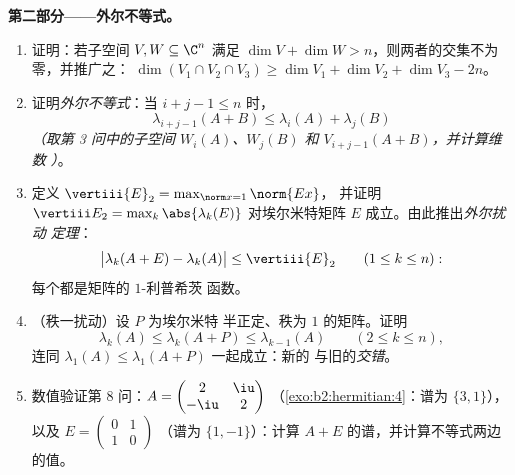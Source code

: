 \begin{problem}
\medskip
\noindent\textbf{第二部分——外尔不等式。}
\begin{enumerate}[resume]
  \item 证明：若子空间 $V, W \subseteq \C^n$ 满足 $\dim V
        + \dim W > n$，则两者的交集不为零，并推广之：
        $\dim(V_1 \cap V_2 \cap V_3) \geq \dim V_1 + \dim V_2 +
        \dim V_3 - 2n$。
  \item 证明\emph{外尔不等式}：当 $i + j - 1 \leq n$ 时，
        \[
        \lambda_{i+j-1}(A + B) \leq \lambda_i(A) +
        \lambda_j(B)
        \]
        \emph{（取第 3 问中的子空间 $W_i(A)$、$W_j(B)$ 和
        $V_{i+j-1}(A+B)$，并计算维数
        ）}。
  \item 定义 $\vertiii{E}_2 = \max_{\norm x = 1}\norm{Ex}$，
        并证明 $\vertiii E_2 = \max_k\abs{\lambda_k(E)}$ 对埃尔米特矩阵
        $E$ 成立。由此推出\emph{外尔扰动
        定理}：
        \[
        \bigl|\lambda_k(A + E) - \lambda_k(A)\bigr| \leq
        \vertiii{E}_2
        \qquad (1 \leq k \leq n) :
        \]
        每个都是矩阵的 $1$-利普希茨
        函数。
  \item （秩一扰动）设 $P$ 为埃尔米特
        半正定、秩为 $1$ 的矩阵。证明
        \[
        \lambda_k(A) \leq \lambda_k(A + P) \leq
        \lambda_{k-1}(A) \qquad (2 \leq k \leq n),
        \]
        连同 $\lambda_1(A) \leq \lambda_1(A+P)$ 一起成立：新的
        与旧的\emph{交错}。
  \item 数值验证第 8 问：$A = \begin{pmatrix} 2 &
        \iu\\ -\iu & 2\end{pmatrix}$
        （\cref{exo:b2:hermitian:4}：谱为 $\{3, 1\}$），以及
        $E = \begin{pmatrix} 0 & 1\\ 1 & 0\end{pmatrix}$
        （谱为 $\{1, -1\}$）：计算 $A +
        E$ 的谱，并计算不等式两边的值。
\end{enumerate}


\end{problem}
